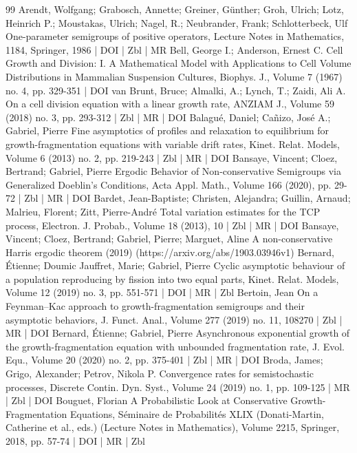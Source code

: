 \begin{thebibliography}{99}
Arendt, Wolfgang; Grabosch, Annette; Greiner, Günther; Groh, Ulrich; Lotz, Heinrich P.; Moustakas, Ulrich; Nagel, R.; Neubrander, Frank; Schlotterbeck, Ulf One-parameter semigroups of positive operators, Lecture Notes in Mathematics, 1184, Springer, 1986 | DOI | Zbl | MR
Bell, George I.; Anderson, Ernest C. Cell Growth and Division: I. A Mathematical Model with Applications to Cell Volume Distributions in Mammalian Suspension Cultures, Biophys. J., Volume 7 (1967) no. 4, pp. 329-351 | DOI
van Brunt, Bruce; Almalki, A.; Lynch, T.; Zaidi, Ali A. On a cell division equation with a linear growth rate, ANZIAM J., Volume 59 (2018) no. 3, pp. 293-312 | Zbl | MR | DOI
Balagué, Daniel; Cañizo, José A.; Gabriel, Pierre Fine asymptotics of profiles and relaxation to equilibrium for growth-fragmentation equations with variable drift rates, Kinet. Relat. Models, Volume 6 (2013) no. 2, pp. 219-243 | Zbl | MR | DOI
Bansaye, Vincent; Cloez, Bertrand; Gabriel, Pierre Ergodic Behavior of Non-conservative Semigroups via Generalized Doeblin’s Conditions, Acta Appl. Math., Volume 166 (2020), pp. 29-72 | Zbl | MR | DOI
Bardet, Jean-Baptiste; Christen, Alejandra; Guillin, Arnaud; Malrieu, Florent; Zitt, Pierre-André Total variation estimates for the TCP process, Electron. J. Probab., Volume 18 (2013), 10 | Zbl | MR | DOI
Bansaye, Vincent; Cloez, Bertrand; Gabriel, Pierre; Marguet, Aline A non-conservative Harris ergodic theorem (2019) (https://arxiv.org/abs/1903.03946v1)
Bernard, Étienne; Doumic Jauffret, Marie; Gabriel, Pierre Cyclic asymptotic behaviour of a population reproducing by fission into two equal parts, Kinet. Relat. Models, Volume 12 (2019) no. 3, pp. 551-571 | DOI | MR | Zbl
Bertoin, Jean On a Feynman–Kac approach to growth-fragmentation semigroups and their asymptotic behaviors, J. Funct. Anal., Volume 277 (2019) no. 11, 108270 | Zbl | MR | DOI
Bernard, Étienne; Gabriel, Pierre Asynchronous exponential growth of the growth-fragmentation equation with unbounded fragmentation rate, J. Evol. Equ., Volume 20 (2020) no. 2, pp. 375-401 | Zbl | MR | DOI
Broda, James; Grigo, Alexander; Petrov, Nikola P. Convergence rates for semistochastic processes, Discrete Contin. Dyn. Syst., Volume 24 (2019) no. 1, pp. 109-125 | MR | Zbl | DOI
Bouguet, Florian A Probabilistic Look at Conservative Growth-Fragmentation Equations, Séminaire de Probabilités XLIX (Donati-Martin, Catherine et al., eds.) (Lecture Notes in Mathematics), Volume 2215, Springer, 2018, pp. 57-74 | DOI | MR | Zbl

\end{thebibliography}
